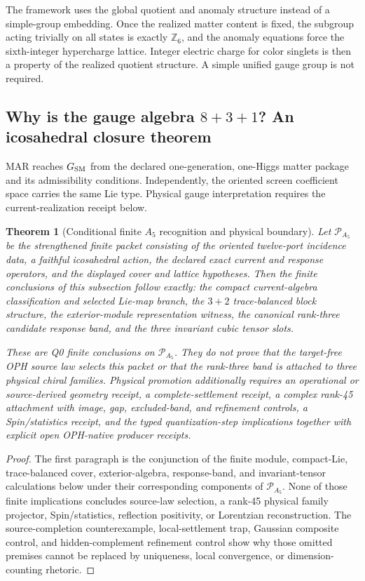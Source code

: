 \documentclass[11pt]{article}
\newtheorem{theorem}{Theorem}[section]
\begin{document}
The framework uses the global quotient and anomaly structure instead of a simple-group embedding. Once the realized matter content is fixed, the subgroup acting trivially on all states is exactly $\mathbb Z_6$, and the anomaly equations force the sixth-integer hypercharge lattice. Integer electric charge for color singlets is then a property of the realized quotient structure. A simple unified gauge group is not required.

\subsection{Why is the gauge algebra \texorpdfstring{$8+3+1$}{8+3+1}? An icosahedral closure theorem}

MAR reaches \(G_{\rm SM}\) from the declared one-generation, one-Higgs
matter package and its admissibility conditions.
Independently, the oriented screen coefficient space carries the same Lie type.
Physical gauge interpretation requires the current-realization receipt below.

\begin{theorem}[Conditional finite \(A_5\) recognition and physical boundary]
\label{thm:a5-q0-recognition-boundary}
Let \(\mathcal P_{A_5}\) be the strengthened finite packet consisting of the
oriented twelve-port incidence data, a faithful icosahedral action, the
declared exact current and response operators, and the displayed cover and
lattice hypotheses. Then the finite conclusions of this subsection follow
exactly: the compact current-algebra classification and selected Lie-map
branch, the \(3+2\) trace-balanced block structure, the exterior-module
representation witness, the canonical rank-three candidate response band,
and the three invariant cubic tensor slots.

These are Q0 finite conclusions on \(\mathcal P_{A_5}\). They do not prove
that the target-free OPH source law selects this packet or that the rank-three
band is attached to three physical chiral families. Physical promotion
additionally requires an operational or source-derived geometry receipt, a
complete-settlement receipt, a complex rank-45 attachment with image, gap,
excluded-band, and refinement controls, a Spin/statistics receipt, and the
typed quantization-step implications together with explicit open
OPH-native producer receipts.
\end{theorem}

\begin{proof}
The first paragraph is the conjunction of the finite module, compact-Lie,
trace-balanced cover, exterior-algebra, response-band, and invariant-tensor
calculations below under their corresponding components of
\(\mathcal P_{A_5}\). None of those finite implications concludes source-law
selection, a rank-45 physical family projector, Spin/statistics, reflection
positivity, or Lorentzian reconstruction. The source-completion
counterexample, local-settlement trap, Gaussian composite control, and
hidden-complement refinement control show why those omitted premises cannot be
replaced by uniqueness, local convergence, or dimension-counting rhetoric.
\end{proof}
\end{document}
